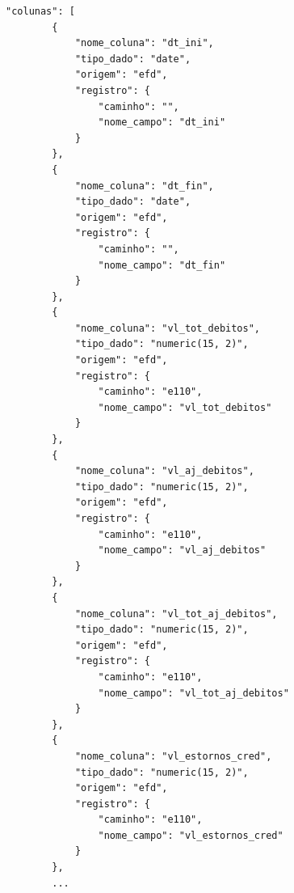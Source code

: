 \begin{quadro}[H]
    \centering
\begin{lstlisting}[basicstyle=\ttfamily\footnotesize, frame=single]
    "colunas": [
        {
            "nome_coluna": "dt_ini",
            "tipo_dado": "date",
            "origem": "efd",
            "registro": {
                "caminho": "",
                "nome_campo": "dt_ini"
            }
        },
        {
            "nome_coluna": "dt_fin",
            "tipo_dado": "date",
            "origem": "efd",
            "registro": {
                "caminho": "",
                "nome_campo": "dt_fin"
            }
        },
        {
            "nome_coluna": "vl_tot_debitos",
            "tipo_dado": "numeric(15, 2)",
            "origem": "efd",
            "registro": {
                "caminho": "e110",
                "nome_campo": "vl_tot_debitos"
            }
        },
        {
            "nome_coluna": "vl_aj_debitos",
            "tipo_dado": "numeric(15, 2)",
            "origem": "efd",
            "registro": {
                "caminho": "e110",
                "nome_campo": "vl_aj_debitos"
            }
        },
        {
            "nome_coluna": "vl_tot_aj_debitos",
            "tipo_dado": "numeric(15, 2)",
            "origem": "efd",
            "registro": {
                "caminho": "e110",
                "nome_campo": "vl_tot_aj_debitos"
            }
        },
        {
            "nome_coluna": "vl_estornos_cred",
            "tipo_dado": "numeric(15, 2)",
            "origem": "efd",
            "registro": {
                "caminho": "e110",
                "nome_campo": "vl_estornos_cred"
            }
        },
        ...
\end{lstlisting}
\end{quadro}
